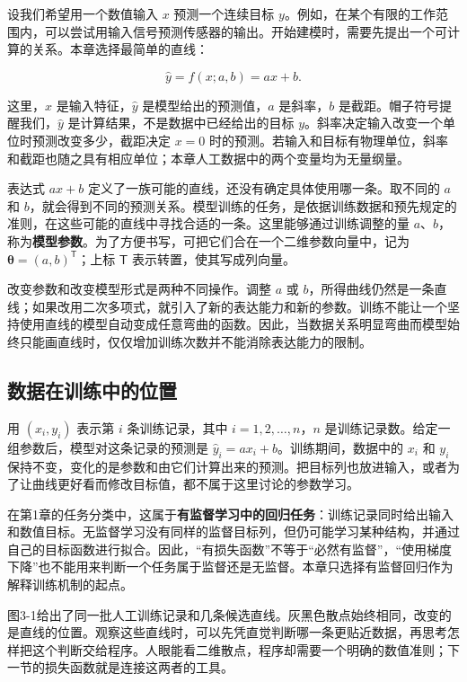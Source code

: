 设我们希望用一个数值输入 \(x\) 预测一个连续目标 \(y\)。例如，在某个有限的工作范围内，可以尝试用输入信号预测传感器的输出。开始建模时，需要先提出一个可计算的关系。本章选择最简单的直线：

\[\widehat{y} = f(x;a,b) = ax + b.\]

这里，\(x\) 是输入特征，\(\widehat{y}\) 是模型给出的预测值，\(a\) 是斜率，\(b\) 是截距。帽子符号提醒我们，\(\widehat{y}\) 是计算结果，不是数据中已经给出的目标 \(y\)。斜率决定输入改变一个单位时预测改变多少，截距决定 \(x = 0\) 时的预测。若输入和目标有物理单位，斜率和截距也随之具有相应单位；本章人工数据中的两个变量均为无量纲量。

表达式 \(ax + b\) 定义了一族可能的直线，还没有确定具体使用哪一条。取不同的 \(a\) 和 \(b\)，就会得到不同的预测关系。模型训练的任务，是依据训练数据和预先规定的准则，在这些可能的直线中寻找合适的一条。这里能够通过训练调整的量 \(a\)、\(b\)，称为\textbf{模型参数}。为了方便书写，可把它们合在一个二维参数向量中，记为 \(\mathbf{\theta} = (a,b)^{\mathsf{T}}\)；上标 \(\mathsf{T}\) 表示转置，使其写成列向量。

改变参数和改变模型形式是两种不同操作。调整 \(a\) 或 \(b\)，所得曲线仍然是一条直线；如果改用二次多项式，就引入了新的表达能力和新的参数。训练不能让一个坚持使用直线的模型自动变成任意弯曲的函数。因此，当数据关系明显弯曲而模型始终只能画直线时，仅仅增加训练次数并不能消除表达能力的限制。

\subsection{数据在训练中的位置}

用 \(\left( x_{i},y_{i} \right)\) 表示第 \(i\) 条训练记录，其中 \(i = 1,2,\ldots,n\)，\(n\) 是训练记录数。给定一组参数后，模型对这条记录的预测是 \({\widehat{y}}_{i} = ax_{i} + b\)。训练期间，数据中的 \(x_{i}\) 和 \(y_{i}\) 保持不变，变化的是参数和由它们计算出来的预测。把目标列也放进输入，或者为了让曲线更好看而修改目标值，都不属于这里讨论的参数学习。

在第1章的任务分类中，这属于\textbf{有监督学习中的回归任务}：训练记录同时给出输入和数值目标。无监督学习没有同样的监督目标列，但仍可能学习某种结构，并通过自己的目标函数进行拟合。因此，``有损失函数''不等于``必然有监督''，``使用梯度下降''也不能用来判断一个任务属于监督还是无监督。本章只选择有监督回归作为解释训练机制的起点。

图3-1给出了同一批人工训练记录和几条候选直线。灰黑色散点始终相同，改变的是直线的位置。观察这些直线时，可以先凭直觉判断哪一条更贴近数据，再思考怎样把这个判断交给程序。人眼能看二维散点，程序却需要一个明确的数值准则；下一节的损失函数就是连接这两者的工具。


